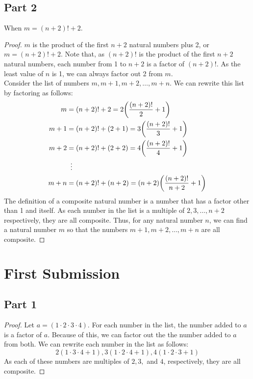 \documentclass[article, 12pt]{article}
\theoremstyle{definition}
\DeclarePairedDelimiter\paren{(}{)} %
\begin{document}
    \subsection*{Part 2}
    When $m = (n+2)! + 2$.
    \begin{proof}
        $m$ is the product of the first $n+2$ natural numbers plus 2, or $m = (n+2)! + 2$. Note that, as $(n+2)!$ is the product of the first $n+2$ natural numbers, each number from 1 to $n+2$ is a factor of $(n+2)!$. As the least value of $n$ is 1, we can always factor out 2 from $m$.
        \\[12pt]
        Consider the list of numbers $m, m+1, m+2, \dots, m+n$. We can rewrite this list by factoring as follows:
        \begin{align*}
            m &= (n+2)! + 2 = 2\paren*{\frac{(n+2)!}{2} + 1} \\
            m+1 &= (n+2)! + (2+1) = 3\paren*{\frac{(n+2)!}{3} + 1} \\
            m+2 &= (n+2)! + (2+2) = 4\paren*{\frac{(n+2)!}{4} + 1} \\
            &\vdotswithin{=} \\
            m+n &= (n+2)! + (n+2) = (n+2)\paren*{\frac{(n+2)!}{n+2} + 1}
        \end{align*}
        The definition of a composite natural number is a number that has a factor other than 1 and itself. As each number in the list is a multiple of $2,3,\dots, n+2$ respectively, they are all composite. Thus, for any natural number $n$, we can find a natural number $m$ so that the numbers $m+1,m+2,\dots,m+n$ are all composite. 
    \end{proof}
    \pagebreak
    \section*{First Submission}
    \subsection*{Part 1}
    \begin{proof}
        Let $a = (1 \cdot 2 \cdot 3 \cdot 4)$. For each number in the list, the number added to $a$ is a factor of $a$. Because of this, we can factor out the the number added to $a$ from both. We can rewrite each number in the list as follows:
        \[ 2(1 \cdot 3 \cdot 4 + 1), 3(1 \cdot 2 \cdot 4 + 1), 4(1 \cdot 2 \cdot 3 + 1) \]
        As each of these numbers are multiples of $2,3,$ and $4$, respectively, they are all composite.
    \end{proof}
\end{document}
